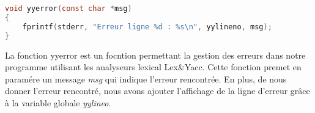 \lstset{style=mystyle}
\begin{lstlisting}[language=C, caption=Message d'erreur]
void yyerror(const char *msg)
{
    fprintf(stderr, "Erreur ligne %d : %s\n", yylineno, msg);
}

\end{lstlisting}

La fonction yyerror est un focntion permettant la gestion des erreurs dans notre programme utilisant les analyseurs lexical Lex&Yacc. 
Cette fonction premet en paramére un message \textit{msg} qui indique l'erreur rencontrée. En plus, de nous donner l'erreur rencontré, nous avons ajouter l'affichage de la ligne d'erreur grâce à la variable globale \textit{yylineo}.

\newpage